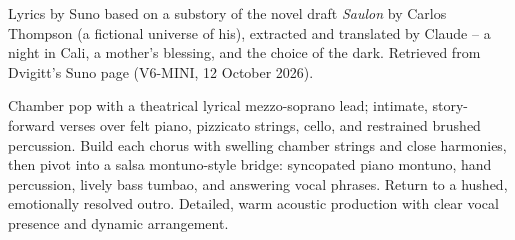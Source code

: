 
\begin{notes}
Lyrics by Suno based on a substory of the novel draft \emph{Saulon} by Carlos Thompson (a fictional universe of his), extracted and translated by Claude -- a night in Cali, a mother's blessing, and the choice of the dark. Retrieved from Dvigitt's Suno page (V6-MINI, 12 October 2026).
\end{notes}
\begin{style}
Chamber pop with a theatrical lyrical mezzo-soprano lead; intimate, story-forward verses over felt piano, pizzicato strings, cello, and restrained brushed percussion. Build each chorus with swelling chamber strings and close harmonies, then pivot into a salsa montuno-style bridge: syncopated piano montuno, hand percussion, lively bass tumbao, and answering vocal phrases. Return to a hushed, emotionally resolved outro. Detailed, warm acoustic production with clear vocal presence and dynamic arrangement.
\end{style}
